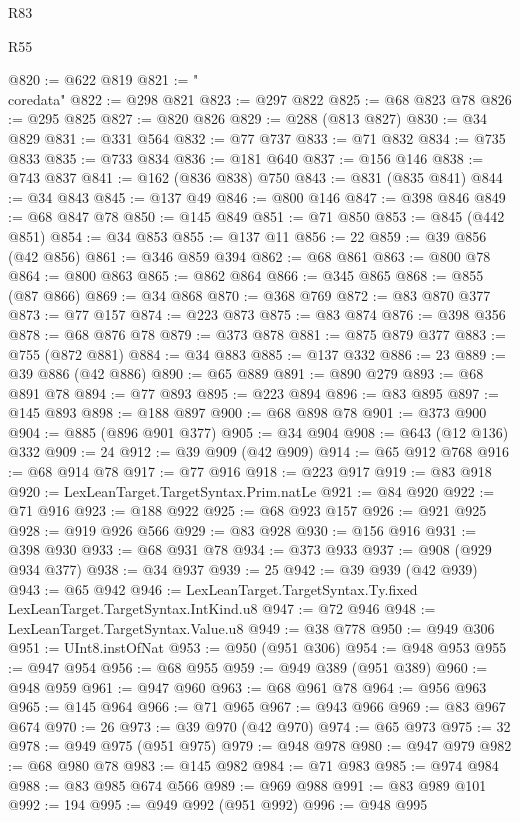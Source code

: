 \begin{lexlean}{R83}
\begin{lexlean}{R55}
\begin{coremodule}
{{{{{{{{{{{{{{{{{{{{{{{{{{{{{{{{{{{{{{{{{{{{{{{{{{{{{{{{{{{{{{@820 := @622 @819
@821 := "\\coredata"
@822 := @298 @821
@823 := @297 @822
@825 := @68 @823 @78
@826 := @295 @825
@827 := @820 @826
@829 := @288 (@813 @827)
@830 := @34 @829
@831 := @331 @564
@832 := @77 @737
@833 := @71 @832
@834 := @735 @833
@835 := @733 @834
@836 := @181 @640
@837 := @156 @146
@838 := @743 @837
@841 := @162 (@836 @838) @750
@843 := @831 (@835 @841)
@844 := @34 @843
@845 := @137 @49
@846 := @800 @146
@847 := @398 @846
@849 := @68 @847 @78
@850 := @145 @849
@851 := @71 @850
@853 := @845 (@442 @851)
@854 := @34 @853
@855 := @137 @11
@856 := 22
@859 := @39 @856 (@42 @856)
@861 := @346 @859 @394
@862 := @68 @861
@863 := @800 @78
@864 := @800 @863
@865 := @862 @864
@866 := @345 @865
@868 := @855 (@87 @866)
@869 := @34 @868
@870 := @368 @769
@872 := @83 @870 @377
@873 := @77 @157
@874 := @223 @873
@875 := @83 @874
@876 := @398 @356
@878 := @68 @876 @78
@879 := @373 @878
@881 := @875 @879 @377
@883 := @755 (@872 @881)
@884 := @34 @883
@885 := @137 @332
@886 := 23
@889 := @39 @886 (@42 @886)
@890 := @65 @889
@891 := @890 @279
@893 := @68 @891 @78
@894 := @77 @893
@895 := @223 @894
@896 := @83 @895
@897 := @145 @893
@898 := @188 @897
@900 := @68 @898 @78
@901 := @373 @900
@904 := @885 (@896 @901 @377)
@905 := @34 @904
@908 := @643 (@12 @136) @332
@909 := 24
@912 := @39 @909 (@42 @909)
@914 := @65 @912 @768
@916 := @68 @914 @78
@917 := @77 @916
@918 := @223 @917
@919 := @83 @918
@920 := LexLeanTarget.TargetSyntax.Prim.natLe
@921 := @84 @920
@922 := @71 @916
@923 := @188 @922
@925 := @68 @923 @157
@926 := @921 @925
@928 := @919 @926 @566
@929 := @83 @928
@930 := @156 @916
@931 := @398 @930
@933 := @68 @931 @78
@934 := @373 @933
@937 := @908 (@929 @934 @377)
@938 := @34 @937
@939 := 25
@942 := @39 @939 (@42 @939)
@943 := @65 @942
@946 := LexLeanTarget.TargetSyntax.Ty.fixed LexLeanTarget.TargetSyntax.IntKind.u8
@947 := @72 @946
@948 := LexLeanTarget.TargetSyntax.Value.u8
@949 := @38 @778
@950 := @949 @306
@951 := UInt8.instOfNat
@953 := @950 (@951 @306)
@954 := @948 @953
@955 := @947 @954
@956 := @68 @955
@959 := @949 @389 (@951 @389)
@960 := @948 @959
@961 := @947 @960
@963 := @68 @961 @78
@964 := @956 @963
@965 := @145 @964
@966 := @71 @965
@967 := @943 @966
@969 := @83 @967 @674
@970 := 26
@973 := @39 @970 (@42 @970)
@974 := @65 @973
@975 := 32
@978 := @949 @975 (@951 @975)
@979 := @948 @978
@980 := @947 @979
@982 := @68 @980 @78
@983 := @145 @982
@984 := @71 @983
@985 := @974 @984
@988 := @83 @985 @674 @566
@989 := @969 @988
@991 := @83 @989 @101
@992 := 194
@995 := @949 @992 (@951 @992)
@996 := @948 @995
}}}}}}}}}}}}}}}}}}}}}}}}}}}}}}}}}}}}}}}}}}}}}}}}}}}}}}}}}}}}}}
\end{coremodule}
\end{lexlean}
\end{lexlean}
